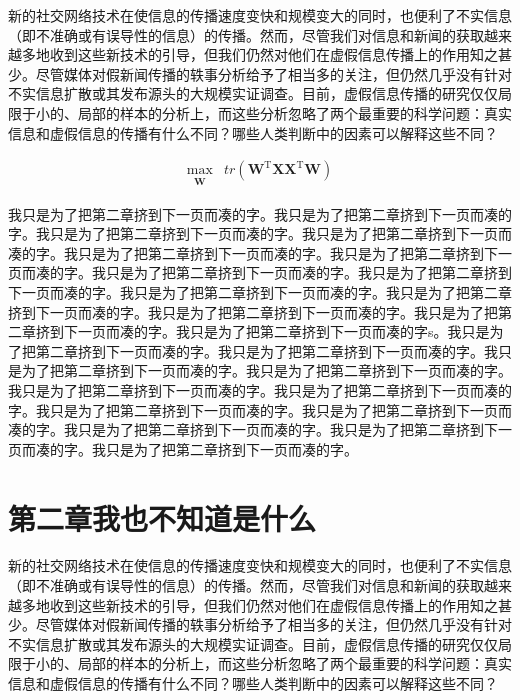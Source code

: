\documentclass[a4paper,AutoFakeBold,oneside,12pt]{book}
\begin{document}
\begin{nopagenumber}
新的社交网络技术在使信息的传播速度变快和规模变大的同时，也便利了不实信息（即不准确或有误导性的信息）的传播。然而，尽管我们对信息和新闻的获取越来越多地收到这些新技术的引导，但我们仍然对他们在虚假信息传播上的作用知之甚少。尽管媒体对假新闻传播的轶事分析给予了相当多的关注，但仍然几乎没有针对不实信息扩散或其发布源头的大规模实证调查。目前，虚假信息传播的研究仅仅局限于小的、局部的样本的分析上，而这些分析忽略了两个最重要的科学问题：真实信息和虚假信息的传播有什么不同？哪些人类判断中的因素可以解释这些不同？

\begin{equation}
\label{PCA_goal_appx1}
\begin{aligned}
\max_{\substack{\bm{W}}}  &  tr(\bm{W}^\mathrm{T}\bm{X}\bm{X}^ \mathrm{T}\bm{W})
\end{aligned}
\end{equation}

我只是为了把第二章挤到下一页而凑的字。我只是为了把第二章挤到下一页而凑的字。我只是为了把第二章挤到下一页而凑的字。我只是为了把第二章挤到下一页而凑的字。我只是为了把第二章挤到下一页而凑的字。我只是为了把第二章挤到下一页而凑的字。我只是为了把第二章挤到下一页而凑的字。我只是为了把第二章挤到下一页而凑的字。我只是为了把第二章挤到下一页而凑的字。我只是为了把第二章挤到下一页而凑的字。我只是为了把第二章挤到下一页而凑的字。我只是为了把第二章挤到下一页而凑的字。我只是为了把第二章挤到下一页而凑的字s。我只是为了把第二章挤到下一页而凑的字。我只是为了把第二章挤到下一页而凑的字。我只是为了把第二章挤到下一页而凑的字。我只是为了把第二章挤到下一页而凑的字。我只是为了把第二章挤到下一页而凑的字。我只是为了把第二章挤到下一页而凑的字。我只是为了把第二章挤到下一页而凑的字。我只是为了把第二章挤到下一页而凑的字。我只是为了把第二章挤到下一页而凑的字。我只是为了把第二章挤到下一页而凑的字。我只是为了把第二章挤到下一页而凑的字。

\newpage %
\chapter*{第二章\quad{}我也不知道是什么}
\newtranschapter

新的社交网络技术在使信息的传播速度变快和规模变大的同时，也便利了不实信息（即不准确或有误导性的信息）的传播。然而，尽管我们对信息和新闻的获取越来越多地收到这些新技术的引导，但我们仍然对他们在虚假信息传播上的作用知之甚少。尽管媒体对假新闻传播的轶事分析给予了相当多的关注，但仍然几乎没有针对不实信息扩散或其发布源头的大规模实证调查。目前，虚假信息传播的研究仅仅局限于小的、局部的样本的分析上，而这些分析忽略了两个最重要的科学问题：真实信息和虚假信息的传播有什么不同？哪些人类判断中的因素可以解释这些不同？


\end{nopagenumber}
\end{document}
